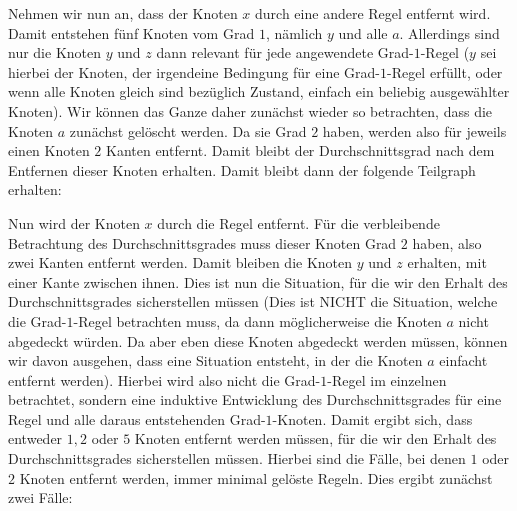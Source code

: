 \documentclass[12pt,onecolumn, notitlepage]{scrartcl}
\begin{document}
Nehmen wir nun an, dass der Knoten $x$ durch eine andere Regel entfernt wird. Damit entstehen fünf Knoten vom Grad $1$, nämlich $y$ und alle $a$. Allerdings sind nur die Knoten $y$ und $z$ dann relevant für jede angewendete Grad-$1$-Regel ($y$ sei hierbei der Knoten, der irgendeine Bedingung für eine Grad-$1$-Regel erfüllt, oder wenn alle Knoten gleich sind bezüglich Zustand, einfach ein beliebig ausgewählter Knoten). Wir können das Ganze daher zunächst wieder so betrachten, dass die Knoten $a$ zunächst gelöscht werden. Da sie Grad $2$ haben, werden also für jeweils einen Knoten $2$ Kanten entfernt. Damit bleibt der Durchschnittsgrad nach dem Entfernen dieser Knoten erhalten. Damit bleibt dann der folgende Teilgraph erhalten:
\begin{center}
\end{center}
Nun wird der Knoten $x$ durch die Regel entfernt. Für die verbleibende Betrachtung des Durchschnittsgrades muss dieser Knoten Grad $2$ haben, also zwei Kanten entfernt werden. Damit bleiben die Knoten $y$ und $z$ erhalten, mit einer Kante zwischen ihnen. Dies ist nun die Situation, für die wir den Erhalt des Durchschnittsgrades sicherstellen müssen (Dies ist NICHT die Situation, welche die Grad-$1$-Regel betrachten muss, da dann möglicherweise die Knoten $a$ nicht abgedeckt würden. Da aber eben diese Knoten abgedeckt werden müssen, können wir davon ausgehen, dass eine Situation entsteht, in der die Knoten $a$ einfacht entfernt werden). Hierbei wird also nicht die Grad-$1$-Regel im einzelnen betrachtet, sondern eine induktive Entwicklung des Durchschnittsgrades für eine Regel und alle daraus entstehenden Grad-$1$-Knoten. \newline
Damit ergibt sich, dass entweder $1,2$ oder $5$ Knoten entfernt werden müssen, für die wir den Erhalt des Durchschnittsgrades sicherstellen müssen. Hierbei sind die Fälle, bei denen $1$ oder $2$ Knoten entfernt werden, immer minimal gelöste Regeln. Dies ergibt zunächst zwei Fälle: \newline \newline 
\end{document}
